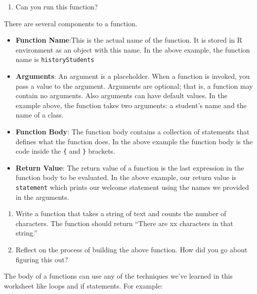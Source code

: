 \documentclass[
]{article}
\providecommand{\tightlist}{%
  \setlength{\itemsep}{0pt}\setlength{\parskip}{0pt}}
\begin{document}
\begin{enumerate}
\def\labelenumi{(\arabic{enumi})}
\setcounter{enumi}{19}
\tightlist
\item
  Can you run this function?
\end{enumerate}

There are several components to a function.

\begin{itemize}
\tightlist
\item
  \textbf{Function Name}:This is the actual name of the function. It is
  stored in R environment as an object with this name. In the above
  example, the function name is \texttt{historyStudents}
\item
  \textbf{Arguments}: An argument is a placeholder. When a function is
  invoked, you pass a value to the argument. Arguments are optional;
  that is, a function may contain no arguments. Also arguments can have
  default values. In the example above, the function takes two
  arguments: a student's name and the name of a class.
\item
  \textbf{Function Body}: The function body contains a collection of
  statements that defines what the function does. In the above example
  the function body is the code inside the \texttt{\{} and \texttt{\}}
  brackets.
\item
  \textbf{Return Value}: The return value of a function is the last
  expression in the function body to be evaluated. In the above example,
  our return value is \texttt{statement} which prints our welcome
  statement using the names we provided in the arguments.
\end{itemize}

\begin{enumerate}
\def\labelenumi{(\arabic{enumi})}
\setcounter{enumi}{20}
\item
  Write a function that takes a string of text and counts the number of
  characters. The function should return ``There are xx characters in
  that string.''
\item
  Reflect on the process of building the above function. How did you go
  about figuring this out?
\end{enumerate}

\begin{quote}
\end{quote}

The body of a functions can use any of the techniques we've learned in
this worksheet like loops and if statements. For example:
\end{document}
